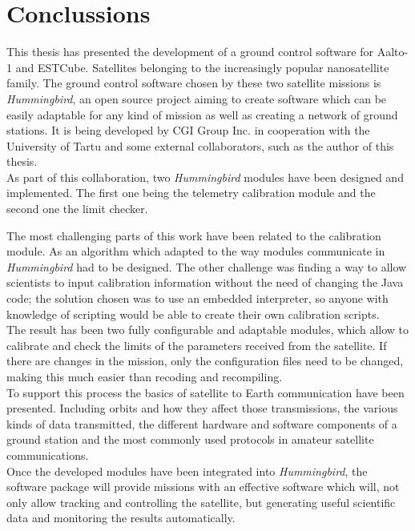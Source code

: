 \chapter{Conclussions}

This thesis has presented the development of a ground control software for Aalto-1 and ESTCube. Satellites belonging to the increasingly popular nanosatellite family. The ground control software chosen by these two satellite missions is \emph{Hummingbird}, an open source project aiming to create software which can be easily adaptable for any kind of mission as well as creating a network of ground stations. It is being developed by CGI Group Inc. in cooperation with the University of Tartu and some external collaborators, such as the author of this thesis.\\ 


As part of this collaboration, two \emph{Hummingbird} modules have been designed and implemented. The first one being the telemetry calibration module and the second one the limit checker. 

The most challenging parts of this work have been related to the calibration module. As an algorithm which adapted to the way modules communicate in \emph{Hummingbird} had to be designed. The other challenge was finding a way to allow scientists to input calibration information without the need of changing the Java code; the solution chosen was to use an embedded  interpreter, so anyone with knowledge of scripting would be able to create their own calibration scripts.\\

The result has been two fully configurable and adaptable modules, which allow to calibrate and check the limits of the parameters received from the satellite. If there are changes in the mission, only the configuration files need to be changed, making this much easier than recoding and recompiling.\\

To support this process the basics of satellite to Earth communication have been presented. Including orbits and how they affect those transmissions, the various kinds of data transmitted, the different hardware and software components of a ground station and the most commonly used protocols in amateur satellite communications.\\

\pagebreak
Once the developed modules have been integrated into \emph{Hummingbird}, the software package will provide missions with an effective software which will, not only allow tracking and controlling the satellite, but generating useful scientific data and monitoring the results automatically.\\


\newpage